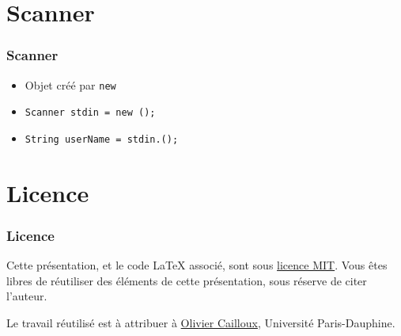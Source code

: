 \documentclass[english, french]{beamer}
\begin{document}
\section{Scanner}
\begin{frame}
	\frametitle{Scanner}
	\begin{itemize}
		\item Objet créé par \texttt{new}
		\item \texttt{Scanner stdin = new ();}
		\item \texttt{String userName = stdin.();}
	\end{itemize}
\end{frame}

\appendix

\section{Licence}
\begin{frame}
	\frametitle{Licence}
	Cette présentation, et le code LaTeX associé, sont sous \href{https://opensource.org/licenses/MIT}{licence MIT}. Vous êtes libres de réutiliser des éléments de cette présentation, sous réserve de citer l’auteur.
	
	Le travail réutilisé est à attribuer à \href{http://www.lamsade.dauphine.fr/~ocailloux/}{Olivier Cailloux}, Université Paris-Dauphine.
\end{frame}
\end{document}

